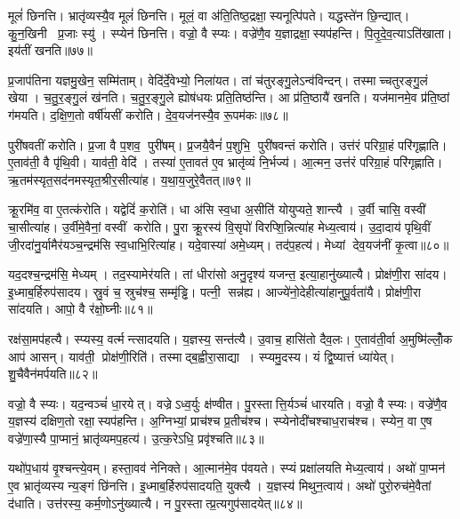मूलं॑ छिनत्ति।
भ्रातृ॑व्यस्यै॒व मूलं॑ छिनत्ति।
मूलं॒ वा अ॑ति॒तिष्ठ॒द्रक्षा॒स्यनूत्पि॑पते।
यद्धस्ते॑न छि॒न्द्यात्।
कु॒न॒खिनी प्र॒जाः स्यु॑।
स्प्येन॑ छिनत्ति।
वज्रो॒ वै स्प्यः।
वज्रे॑णै॒व य॒ज्ञाद्रक्षा॒स्यप॑हन्ति।
पि॒तृ॒दे॒व॒त्याऽति॑खाता।
इय॑तीं खनति॥७७॥

प्र॒जाप॑तिना यज्ञमु॒खेन॒ सम्मि॑ताम्।
वेदि॑र्दे॒वेभ्यो॒ निला॑यत।
तां च॑तुरङ्गु॒लेऽन्व॑विन्दन्।
तस्माच्चतुरङ्गु॒लं खेया।
च॒तु॒र॒ङ्गु॒लं ख॑नति।
च॒तु॒र॒ङ्गु॒ले ह्योष॑धयः प्रति॒तिष्ठ॑न्ति।
आ प्र॑ति॒ष्ठायै॑ खनति।
यज॑मानमे॒व प्र॑ति॒ष्ठां ग॑मयति।
द॒क्षि॒ण॒तो वर्\mbox{}षी॑यसीं करोति।
दे॒व॒यज॑नस्यै॒व रू॒पम॑कः॥७८॥

पुरी॑षवतीं करोति।
प्र॒जा वै प॒शव॒ पुरी॑षम्।
प्र॒जयै॒वैनं॑ प॒शुभि॒ पुरी॑षवन्तं करोति।
उत्त॑रं परिग्रा॒हं परि॑गृह्णाति।
ए॒ताव॑ती॒ वै पृ॑थि॒वी।
याव॑ती॒ वेदि॑।
तस्या॑ ए॒तावत॑ ए॒व भ्रातृ॑व्यं नि॒र्भज्य॑।
आ॒त्मन॒ उत्त॑रं परिग्रा॒हं परि॑गृह्णाति।
ऋ॒तम॑स्यृत॒सद॑नमस्यृत॒श्रीर॒सीत्या॑ह।
य॒था॒य॒जुरे॒वैतत्॥७९॥

क्रू॒रमि॑व॒ वा ए॒तत्क॑रोति।
यद्वेदिं॑ क॒रोति॑।
धा अ॑सि स्व॒धा अ॒सीति॑ योयुप्यते॒ शान्त्यै।
उ॒र्वी चासि॒ वस्वी॑ चा॒सीत्या॑ह।
उ॒र्वीमे॒वैनां॒ वस्वीं करोति।
पु॒रा क्रू॒रस्य॑ वि॒सृपो॑ विरप्शि॒न्नित्या॑ह मेध्य॒त्वाय॑।
उ॒दा॒दाय॑ पृथि॒वीं जी॒रदा॑नु॒र्यामैर॑यञ्च॒न्द्रम॑सि स्व॒धाभि॒रित्या॑ह।
यदे॒वास्या॑ अमे॒ध्यम्।
तद॑प॒हत्य॑।
मेध्यां देव॒यज॑नीं कृ॒त्वा॥८०॥

यद॒दश्च॒न्द्रम॑सि॒ मेध्यम्।
तद॒स्यामेर॑यति।
तां धीरा॑सो अनु॒दृश्य॑ यजन्त॒ इत्या॒हानु॑ख्यात्यै।
प्रोक्ष॑णी॒रा सा॑दय।
इ॒ध्माब॒र्\mbox{}हिरुप॑सादय।
स्रु॒वं च॒ स्रुच॑श्च॒ सम्मृ॑ड्ढि।
पत्नी॒ सन्न॑ह्य।
आज्ये॑नो॒देहीत्या॑हानुपू॒र्वता॑यै।
प्रोक्ष॑णी॒रा सा॑दयति।
आपो॒ वै र॑क्षो॒घ्नीः॥८१॥

रक्ष॑सा॒मप॑हत्यै।
स्प्यस्य॒ वर्त्मन्त्सादयति।
य॒ज्ञस्य॒ सन्त॑त्यै।
उ॒वाच॒ हासि॑तो दैव॒लः।
ए॒ताव॑ती॒र्वा अ॒मुष्मि॑ल्लोँ॒क आप॑ आसन्।
याव॑ती॒ प्रोक्ष॑णी॒रिति॑।
तस्माद्ब॒ह्वीरा॒साद्या।
स्प्यमु॒दस्य\sn{}।
यं द्वि॒ष्यात्तं ध्या॑येत्।
शु॒चैवैन॑मर्पयति॥८२॥

वज्रो॒ वै स्प्यः।
यद॒न्वञ्चं॑ धा॒रयेत्।
वज्रेऽध्व॒र्युः क्ष॑ण्वीत।
पु॒रस्तात्ति॒र्यञ्चं॑ धारयति।
वज्रो॒ वै स्प्यः।
वज्रे॑णै॒व य॒ज्ञस्य॑ दक्षिण॒तो रक्षा॒स्यप॑हन्ति।
अ॒ग्निभ्यां॒ प्राच॑श्च प्र॒तीच॑श्च।
स्प्येनोदी॑चश्चाध॒राच॑श्च।
स्प्येन॒ वा ए॒ष वज्रे॑णा॒स्यै पा॒प्मानं॒ भ्रातृ॑व्यमप॒हत्य॑।
उ॒त्क॒रेऽधि॒ प्रवृ॑श्चति॥८३॥

यथो॑प॒धाय॑ वृ॒श्चन्त्ये॒वम्।
हस्ता॒वव॑ नेनिक्ते।
आ॒त्मान॑मे॒व प॑वयते।
स्प्यं प्रक्षा॑लयति मेध्य॒त्वाय॑।
अथो॑ पा॒प्मन॑ ए॒व भ्रातृ॑व्यस्य न्य॒ङ्गं छि॑नत्ति।
इ॒ध्माब॒र्\mbox{}हिरुप॑सादयति॒ युक्त्यै।
य॒ज्ञस्य॑ मिथुन॒त्वाय॑।
अथो॑ पुरो॒रुच॑मे॒वैतां द॑धाति।
उत्त॑रस्य॒ कर्म॒णोऽनु॑ख्यात्यै।
न पु॒रस्तात्प्र॒त्यगुप॑सादयेत्॥८४॥

